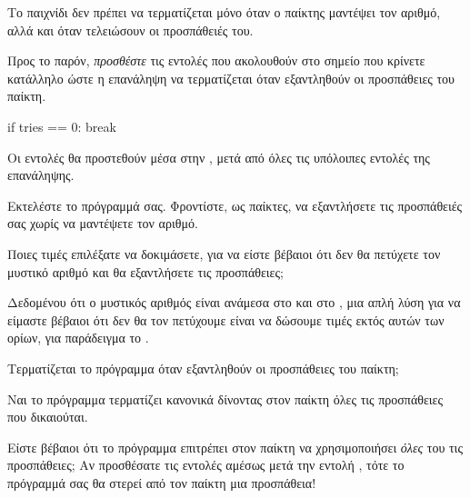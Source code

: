 \documentclass[a4paper,11pt,oneside]{book}
\begin{document}
Το παιχνίδι δεν πρέπει να τερματίζεται μόνο όταν ο παίκτης μαντέψει τον αριθμό, αλλά και όταν τελειώσουν οι προσπάθειές του.

\begin{step}
Προς το παρόν, \emph{προσθέστε} τις εντολές που ακολουθούν στο σημείο που κρίνετε κατάλληλο ώστε η επανάληψη να τερματίζεται όταν εξαντληθούν οι προσπάθειες του παίκτη.

\begin{pynew}
    if tries == 0:
        break
\end{pynew}

\begin{answer}
Οι εντολές θα προστεθούν μέσα στην , μετά από όλες τις υπόλοιπες εντολές της επανάληψης.
\end{answer}

Εκτελέστε το πρόγραμμά σας. Φροντίστε, ως παίκτες, να εξαντλήσετε τις προσπάθειές σας χωρίς να μαντέψετε τον αριθμό. 

Ποιες τιμές επιλέξατε να δοκιμάσετε, για να είστε βέβαιοι ότι δεν θα πετύχετε τον μυστικό αριθμό και θα εξαντλήσετε τις προσπάθειες;

\begin{answer}
Δεδομένου ότι ο μυστικός αριθμός είναι ανάμεσα στο  και στο , μια απλή λύση για να είμαστε βέβαιοι ότι δεν θα τον πετύχουμε είναι να δώσουμε τιμές εκτός αυτών των ορίων, για παράδειγμα το .
\end{answer}

Τερματίζεται το πρόγραμμα όταν εξαντληθούν οι προσπάθειες του παίκτη;

\begin{answer}
Ναι το πρόγραμμα τερματίζει κανονικά δίνοντας στον παίκτη όλες τις προσπάθειες που δικαιούται.
\end{answer}

\marginnote[10pt]{\iconcaution}
Είστε βέβαιοι ότι το πρόγραμμα επιτρέπει στον παίκτη να χρησιμοποιήσει \emph{όλες} του τις προσπάθειες; Αν προσθέσατε τις εντολές αμέσως μετά την εντολή , τότε το πρόγραμμά σας θα στερεί από τον παίκτη μια προσπάθεια!
\end{step}
\end{document}
